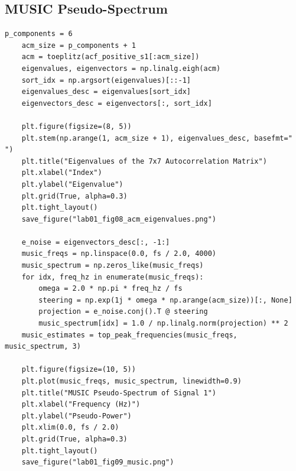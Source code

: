 \documentclass[12pt, a4paper]{article}
\begin{document}
\subsection{MUSIC Pseudo-Spectrum}
\begin{lstlisting}[caption={Autocorrelation matrix construction, eigenanalysis, and MUSIC pseudo-spectrum generation.}, label={lst:lab01_music}]
    p_components = 6
    acm_size = p_components + 1
    acm = toeplitz(acf_positive_s1[:acm_size])
    eigenvalues, eigenvectors = np.linalg.eigh(acm)
    sort_idx = np.argsort(eigenvalues)[::-1]
    eigenvalues_desc = eigenvalues[sort_idx]
    eigenvectors_desc = eigenvectors[:, sort_idx]

    plt.figure(figsize=(8, 5))
    plt.stem(np.arange(1, acm_size + 1), eigenvalues_desc, basefmt=" ")
    plt.title("Eigenvalues of the 7x7 Autocorrelation Matrix")
    plt.xlabel("Index")
    plt.ylabel("Eigenvalue")
    plt.grid(True, alpha=0.3)
    plt.tight_layout()
    save_figure("lab01_fig08_acm_eigenvalues.png")

    e_noise = eigenvectors_desc[:, -1:]
    music_freqs = np.linspace(0.0, fs / 2.0, 4000)
    music_spectrum = np.zeros_like(music_freqs)
    for idx, freq_hz in enumerate(music_freqs):
        omega = 2.0 * np.pi * freq_hz / fs
        steering = np.exp(1j * omega * np.arange(acm_size))[:, None]
        projection = e_noise.conj().T @ steering
        music_spectrum[idx] = 1.0 / np.linalg.norm(projection) ** 2
    music_estimates = top_peak_frequencies(music_freqs, music_spectrum, 3)

    plt.figure(figsize=(10, 5))
    plt.plot(music_freqs, music_spectrum, linewidth=0.9)
    plt.title("MUSIC Pseudo-Spectrum of Signal 1")
    plt.xlabel("Frequency (Hz)")
    plt.ylabel("Pseudo-Power")
    plt.xlim(0.0, fs / 2.0)
    plt.grid(True, alpha=0.3)
    plt.tight_layout()
    save_figure("lab01_fig09_music.png")
\end{lstlisting}
\end{document}
